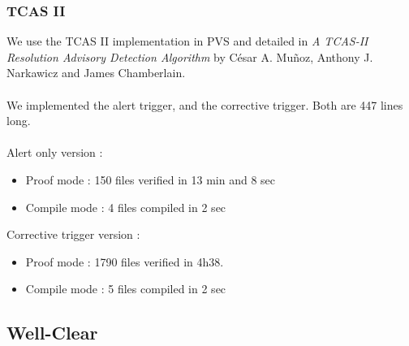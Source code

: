 \documentclass{beamer}
\begin{document}
\begin{frame}[fragile]
\end{frame}

\begin{frame}[fragile]
	\frametitle{TCAS II}
	We use the TCAS II implementation in PVS and detailed in \textit{A TCAS-II Resolution Advisory Detection Algorithm} by C\'esar A. Mu\~{n}oz, Anthony J. Narkawicz and James Chamberlain. \\~\\	
	We implemented the alert trigger, and the corrective trigger.
	Both are 447 lines long. \\~\\
	Alert only version :
\begin{itemize}
\item Proof mode : 150 files verified in 13 min and 8 sec
\item Compile mode : 4 files compiled in 2 sec
\end{itemize}
Corrective trigger version :
\begin{itemize}
\item Proof mode : 1790 files verified in 4h38.
\item Compile mode : 5 files compiled in 2 sec
\end{itemize}
	
\end{frame}

\subsection{Well-Clear}
\begin{frame}
	\tableofcontents[currentsubsection,sectionstyle=show/shaded,subsectionstyle=show/shaded/hide]
\end{frame}
\end{document}

